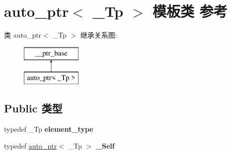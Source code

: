 \hypertarget{classauto__ptr}{}\section{auto\+\_\+ptr$<$ \+\_\+\+Tp $>$ 模板类 参考}
\label{classauto__ptr}
类 auto\+\_\+ptr$<$ \+\_\+\+Tp $>$ 继承关系图\+:\begin{figure}[H]
\begin{center}
\leavevmode
\includegraphics[height=2.000000cm]{classauto__ptr}
\end{center}
\end{figure}
\subsection*{Public 类型}
\begin{DoxyCompactItemize}
\item 
\mbox{\label{classauto__ptr_a5336edfe7460bde1a02e840f9788ae55}} 
typedef \+\_\+\+Tp {\bfseries element\+\_\+type}
\item 
\mbox{\label{classauto__ptr_a297f9965b33b3e9e6a64ccddc1419da4}} 
typedef \hyperlink{classauto__ptr}{auto\+\_\+ptr}$<$ \+\_\+\+Tp $>$ {\bfseries \+\_\+\+Self}
\end{DoxyCompactItemize}
